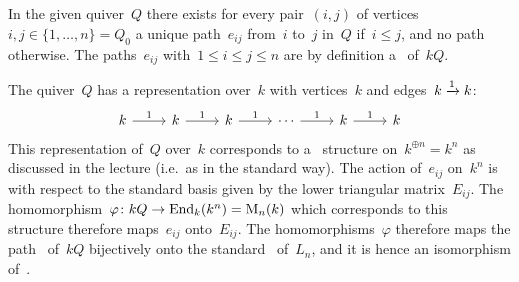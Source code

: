 \section{}

In the given quiver~$Q$ there exists for every pair~$(i,j)$ of vertices~$i,j \in \{1, \dotsc, n\} = Q_0$ a unique path~$e_{ij}$ from~$i$ to~$j$ in~$Q$ if~$i \leq j$, and no path otherwise.
The paths~$e_{ij}$ with~$1 \leq i \leq j \leq n$ are by definition a~{\kbasis} of~$kQ$.

The quiver~$Q$ has a representation over~$k$ with vertices~$k$ and edges~$k \xrightarrow{1} k$:
\[
  \begin{tikzcd}
      k
      \arrow{r}[above]{1}
    & k
      \arrow{r}[above]{1}
    & k
      \arrow{r}[above]{1}
    & \cdots
      \arrow{r}[above]{1}
    & k
      \arrow{r}[above]{1}
    & k
  \end{tikzcd}
\]
This representation of~$Q$ over~$k$ corresponds to a~{} structure on~$k^{\oplus n} = k^n$ as discussed in the lecture (i.e.\ as in the standard way).
The action of~$e_{ij}$ on~$k^n$ is with respect to the standard basis given by the lower triangular matrix~$E_{ij}$.
The~{\kalg} homomorphism~$\varphi \colon kQ \to \operatorname{End}_k(k^n) = \operatorname{M}_{n}(k)$ which corresponds to this~{} structure therefore maps~$e_{ij}$ onto~$E_{ij}$.
The homomorphisms~$\varphi$ therefore maps the path~{\kbasis} of~$kQ$ bijectively onto the standard~{\kbasis} of~$L_n$, and it is hence an isomorphism of~{\kalgs}.

% 
% 
% 
% 
% 



